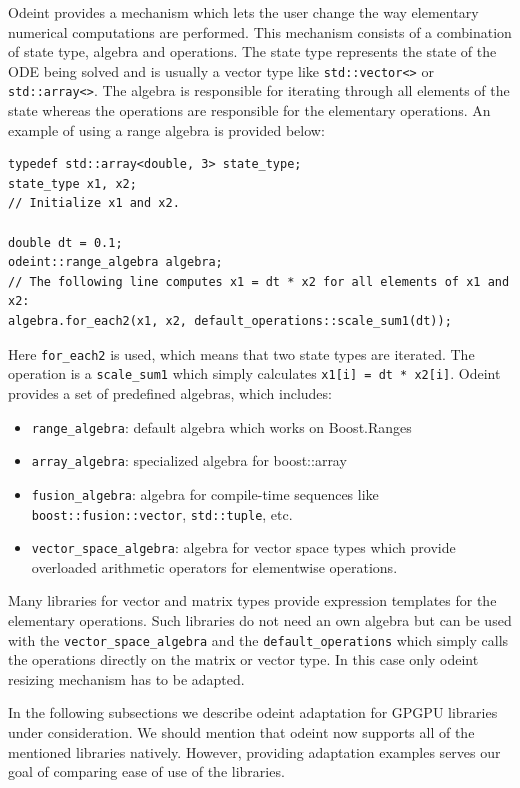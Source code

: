 \documentclass[1p]{elsarticle}
\newcommand{\code}[1]{\lstinline|#1|}
\begin{document}
Odeint provides a mechanism which lets the user change the way
elementary numerical computations are performed. This mechanism consists of a
combination of state type, algebra and operations. The state type represents the
state of the ODE being solved and is usually a vector type like
\code{std::vector<>} or \code{std::array<>}. The algebra is responsible for
iterating through all elements of the state whereas the operations are
responsible for the elementary operations. An example of using a range algebra
is provided below:
\begin{lstlisting}
typedef std::array<double, 3> state_type;
state_type x1, x2;
// Initialize x1 and x2.

double dt = 0.1;
odeint::range_algebra algebra;
// The following line computes x1 = dt * x2 for all elements of x1 and x2:
algebra.for_each2(x1, x2, default_operations::scale_sum1(dt));
\end{lstlisting}
Here \code{for_each2} is used, which means that
two state types are iterated. The operation is a \code{scale_sum1} which simply
calculates \code{x1[i] = dt * x2[i]}. Odeint provides a set of predefined
algebras, which includes:
\begin{itemize}
    \item \code{range_algebra}: default algebra which works on Boost.Ranges
    \item \code{array_algebra}: specialized algebra for boost::array
    \item \code{fusion_algebra}: algebra for compile-time sequences like
        \code{boost::fusion::vector}, \code{std::tuple}, etc.
    \item \code{vector_space_algebra}: algebra for vector space types which
        provide overloaded arithmetic operators for elementwise operations.
\end{itemize}


Many libraries for vector and matrix types provide expression templates for the
elementary operations. Such libraries do not need an own algebra but can be
used with the \code{vector_space_algebra} and the \code{default_operations}
which simply calls the operations directly on the matrix or vector type. In
this case only odeint resizing mechanism has to be adapted.

In the following subsections we describe odeint adaptation for GPGPU libraries
under consideration. We should mention that odeint now supports all of the
mentioned libraries natively. However, providing adaptation examples serves our
goal of comparing ease of use of the libraries.
\end{document}
